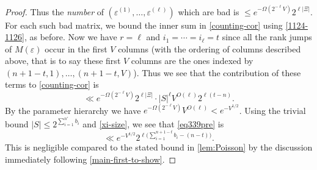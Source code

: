 \documentclass[11pt,reqno]{amsart}
\numberwithin{equation}{section}
\theoremstyle{definition}
\theoremstyle{remark}
\newcommand{\eps}{\varepsilon}
\renewcommand{\le}{\leqslant}
\begin{document}
\begin{proof}
Thus the \emph{number} of $(\eps^{(1)},\dots, \eps^{(\ell)})$ which are bad is $\le e^{-\Omega(2^{-\ell} V)} 2^{\ell |\Xi|}$. For each such bad matrix, we bound the inner sum in \cref{counting-cor} using \cref{1124-1126}, as before. Now we have $r = \ell$ and $i_1 = \cdots = i_{\ell} = t$ since all the rank jumps of $M(\eps)$ occur in the first $V$ columns (with the ordering of columns described above, that is to say these first $V$ columns are the ones indexed by $(n + 1 -t,1),\dots, (n + 1 - t,V)$). Thus we see that the contribution of these terms to \cref{counting-cor} is
\begin{equation}\label{eq339pre} \ll e^{-\Omega(2^{-\ell} V)} 2^{\ell |\Xi|} \cdot |S|^{\ell} V^{O(\ell)} 2^{\ell(t - n)} .\end{equation}
By the parameter hierarchy we have $e^{-\Omega(2^{-\ell} V)} V^{O(\ell)} < e^{-V^{1/2}}$. Using the trivial bound $|S| \le 2^{\sum_{i =1}^{n'} b_i}$ and \cref{xi-size}, we see that \cref{eq339pre} is
\begin{equation*} \ll e^{-V^{1/2}} 2^{\ell \big(\sum_{i =1}^{n + 1 - t} b_i - (n - t)\big)}.\end{equation*} 
This is negligible compared to the stated bound in \cref{lem:Poisson} by the discussion immediately following \cref{main-first-to-show}.\vspace*{8pt}


\end{proof}
\end{document}
